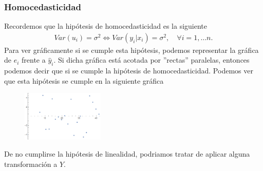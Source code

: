\subsubsection{Homocedasticidad}
\noindent Recordemos que la hipótesis de homocedasticidad es la siguiente
\begin{align*}
    Var(u_i) = \sigma^2 \Longleftrightarrow Var(y_i | x_i) = \sigma^2, \quad \forall i = 1, \dots n.
\end{align*}
Para ver gráficamente si se cumple esta hipótesis, podemos representar la gráfica de $e_i$ frente a $\widehat{y}_i$. Si dicha gráfica está acotada por ''rectas'' paralelas, entonces podemos decir que si se cumple la hipótesis de homocedasticidad. Podemos ver que esta hipótesis se cumple en la siguiente gráfica
\begin{figure}[H]
    \centering
    \includegraphics[width=0.35\textwidth]{imagenes1/linealidady.png}
\end{figure}

\noindent De no cumplirse la hipótesis de linealidad, podriamos tratar de aplicar alguna transformación a $Y$.

